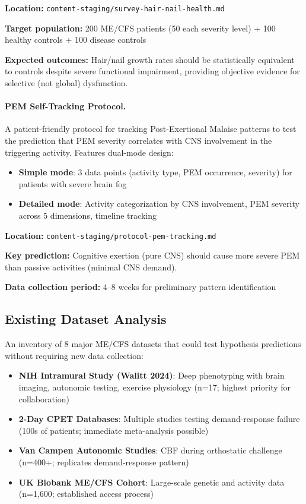 \textbf{Location:} \texttt{content-staging/survey-hair-nail-health.md}

\textbf{Target population:} 200 ME/CFS patients (50 each severity level) + 100 healthy controls + 100 disease controls

\textbf{Expected outcomes:} Hair/nail growth rates should be statistically equivalent to controls despite severe functional impairment, providing objective evidence for selective (not global) dysfunction.

\paragraph{PEM Self-Tracking Protocol.}
A patient-friendly protocol for tracking Post-Exertional Malaise patterns to test the prediction that PEM severity correlates with CNS involvement in the triggering activity. Features dual-mode design:
\begin{itemize}
    \item \textbf{Simple mode}: 3 data points (activity type, PEM occurrence, severity) for patients with severe brain fog
    \item \textbf{Detailed mode}: Activity categorization by CNS involvement, PEM severity across 5 dimensions, timeline tracking
\end{itemize}

\textbf{Location:} \texttt{content-staging/protocol-pem-tracking.md}

\textbf{Key prediction:} Cognitive exertion (pure CNS) should cause more severe PEM than passive activities (minimal CNS demand).

\textbf{Data collection period:} 4--8 weeks for preliminary pattern identification

\subsection{Existing Dataset Analysis}

An inventory of 8 major ME/CFS datasets that could test hypothesis predictions without requiring new data collection:

\begin{itemize}
    \item \textbf{NIH Intramural Study (Walitt 2024)}: Deep phenotyping with brain imaging, autonomic testing, exercise physiology (n=17; highest priority for collaboration)
    \item \textbf{2-Day CPET Databases}: Multiple studies testing demand-response failure (100s of patients; immediate meta-analysis possible)
    \item \textbf{Van Campen Autonomic Studies}: CBF during orthostatic challenge (n=400+; replicates demand-response pattern)
    \item \textbf{UK Biobank ME/CFS Cohort}: Large-scale genetic and activity data (n=1,600; established access process)
\end{itemize}

